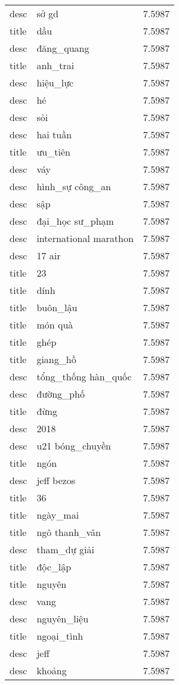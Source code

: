 \documentclass{article}
\begin{document}
\begin{tabular}{lll}
desc & sở gd & 7.5987\\
title & dầu & 7.5987\\
desc & đăng\_quang & 7.5987\\
title & anh\_trai & 7.5987\\
desc & hiệu\_lực & 7.5987\\
desc & hé & 7.5987\\
desc & sỏi & 7.5987\\
desc & hai tuần & 7.5987\\
title & ưu\_tiên & 7.5987\\
desc & váy & 7.5987\\
desc & hình\_sự công\_an & 7.5987\\
desc & sập & 7.5987\\
desc & đại\_học sư\_phạm & 7.5987\\
desc & international marathon & 7.5987\\
desc & 17 air & 7.5987\\
title & 23 & 7.5987\\
title & dính & 7.5987\\
title & buôn\_lậu & 7.5987\\
title & món quà & 7.5987\\
title & ghép & 7.5987\\
title & giang\_hồ & 7.5987\\
desc & tổng\_thống hàn\_quốc & 7.5987\\
desc & đường\_phố & 7.5987\\
title & đừng & 7.5987\\
desc & 2018 & 7.5987\\
desc & u21 bóng\_chuyền & 7.5987\\
title & ngón & 7.5987\\
desc & jeff bezos & 7.5987\\
title & 36 & 7.5987\\
title & ngày\_mai & 7.5987\\
title & ngô thanh\_vân & 7.5987\\
desc & tham\_dự giải & 7.5987\\
title & độc\_lập & 7.5987\\
title & nguyên & 7.5987\\
desc & vang & 7.5987\\
desc & nguyên\_liệu & 7.5987\\
title & ngoại\_tình & 7.5987\\
desc & jeff & 7.5987\\
desc & khoảng & 7.5987\\

\end{tabular}
\end{document}
